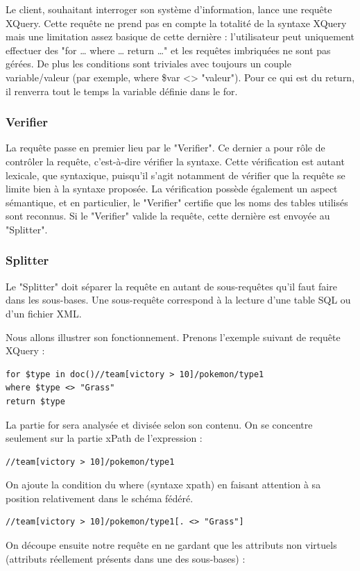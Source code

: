 Le client, souhaitant interroger son système d'information, lance une requête XQuery. Cette requête ne prend pas en compte la totalité de la syntaxe XQuery mais une limitation assez basique de cette dernière : l'utilisateur peut uniquement effectuer des "for … where … return …" et les requêtes imbriquées ne sont pas gérées. De plus les conditions sont triviales avec toujours un couple variable/valeur (par exemple, where \$var <> "valeur"). Pour ce qui est du return, il renverra tout le temps la variable définie dans le for.

\subsubsection{Verifier}

La requête passe en premier lieu par le "Verifier". Ce dernier a pour rôle de contrôler la requête, c'est-à-dire vérifier la syntaxe. Cette vérification est autant lexicale, que syntaxique, puisqu'il s'agit notamment de vérifier que la requête se limite bien à la syntaxe proposée. La vérification possède également un aspect sémantique, et en particulier, le "Verifier" certifie que les noms des tables utilisés sont reconnus. Si le "Verifier" valide la requête, cette dernière est envoyée au "Splitter".

\subsubsection{Splitter}

Le "Splitter" doit séparer la requête en autant de sous-requêtes qu'il faut faire dans les sous-bases. Une sous-requête correspond à la lecture d'une table SQL ou d'un fichier XML. 

Nous allons illustrer son fonctionnement. Prenons l'exemple suivant de requête XQuery :

\begin{lstlisting}
for $type in doc()//team[victory > 10]/pokemon/type1
where $type <> "Grass"
return $type
\end{lstlisting}

La partie for sera analysée et divisée selon son contenu. On se concentre seulement sur la partie xPath de l'expression :
\begin{lstlisting}
//team[victory > 10]/pokemon/type1
\end{lstlisting}
On ajoute la condition du where (syntaxe xpath) en faisant attention à sa position relativement dans le schéma fédéré.
\begin{lstlisting}
//team[victory > 10]/pokemon/type1[. <> "Grass"]
\end{lstlisting}
On découpe ensuite notre requête en ne gardant que les attributs non virtuels (attributs réellement présents dans une des sous-bases) :

